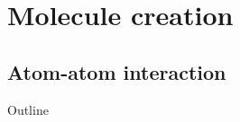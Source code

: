 \documentclass{beamer}
\begin{document}
\section{Molecule creation}

\def\enableinteraction{}


\ifdefined\enableinteraction
\subsection{Atom-atom interaction}
\begin{frame}{Outline}
\end{frame}
\end{document}
